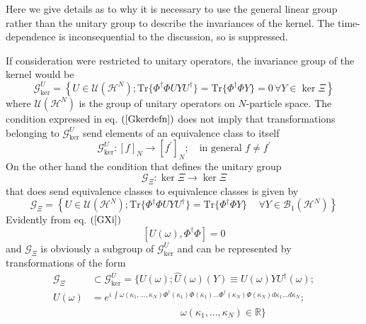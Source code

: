 \documentclass[aps,preprint]{revtex4}%
\begin{document}
\noindent Here we give details as to why it is necessary to use the general
linear group rather than the unitary group to describe the invariances of the
kernel. The time-dependence is inconsequential to the discussion, so is suppressed.

If consideration were restricted to unitary operators, the invariance group of
the kernel would be
\begin{equation}
\mathcal{G}_{\ker}^{U}=\left\{  U\in\mathcal{U}(\mathcal{H}^{N});\mathrm{Tr}%
\{\Phi^{\dagger}\Phi UYU^{\dagger}\}=\mathrm{Tr}\{\Phi^{\dagger}\Phi
Y\}=0\,\forall Y\in\ker\Xi\right\}  \label{Gkerdefn}%
\end{equation}
where $\mathcal{U}(\mathcal{H}^{N})$ is the group of unitary operators on
$N$-particle space. The condition expressed in eq. $\left(  \ref{Gkerdefn}%
\right)  $ does not imply that transformations belonging to $\mathcal{G}%
_{\ker}^{U}$ send elements of an equivalence class to itself
\begin{equation}
\mathcal{G}_{\ker}^{U}:\left[  f\right]  _{N}\rightarrow\left[  f^{\prime
}\right]  _{N};\quad\text{in general }f\neq f^{\prime}%
\end{equation}
On the other hand the condition that defines the unitary group
\begin{equation}
\mathcal{G}_{\Xi}:\ker\Xi\rightarrow\ker\Xi
\end{equation}
that does send equivalence classes to equivalence classes is given by
\begin{equation}
\mathcal{G}_{\Xi}=\left\{  U\in\mathcal{U}(\mathcal{H}^{N});\mathrm{Tr}%
\{\Phi^{\dagger}\Phi UYU^{\dagger}\}=\mathrm{Tr}\{\Phi^{\dagger}\Phi
Y\}\quad\,\forall Y\in\mathcal{B}_{1}\left(  \mathcal{H}^{N}\right)  \right\}
\label{GXi}%
\end{equation}
Evidently from eq. $\left(  \ref{GXi}\right)  $
\begin{equation}
\left[  U(\omega),\Phi^{\dagger}\Phi\right]  =0
\end{equation}
and $\mathcal{G}_{\Xi}$ is obviously a subgroup of $\mathcal{G}_{\ker}^{U}$
and can be represented by transformations of the form
\begin{align}
\mathcal{G}_{\Xi}  &  \subset\mathcal{G}_{\ker}^{U}=\{U(\omega);\hat{U}%
(\omega)(Y)\equiv U(\omega)YU^{\dagger}(\omega);\nonumber\\
U(\omega)  &  =e^{i\,\int\omega(\kappa_{1},\ldots,\kappa_{N})\Phi^{\dagger
}(\kappa_{1})\Phi(\kappa_{1})\ldots\Phi^{\dagger}(\kappa_{N})\Phi(\kappa
_{N})d\kappa_{1}\ldots d\kappa_{N}};\nonumber\\
&  \qquad\qquad\qquad\qquad\quad\omega(\kappa_{1},\ldots,\kappa_{N}%
)\in\mathbb{R}\} \label{GXidefn}%
\end{align}
\end{document}
